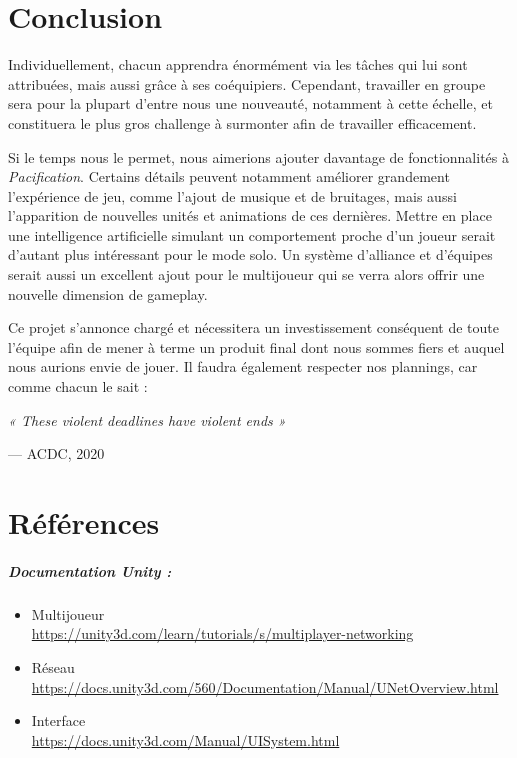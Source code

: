 \documentclass[12pt]{report}
\begin{document}
\chapter{Conclusion}

Individuellement, chacun apprendra énormément via les tâches qui lui sont attribuées, mais aussi grâce à ses coéquipiers. Cependant, travailler en groupe sera pour la plupart d’entre nous une nouveauté, notamment à cette échelle, et constituera le plus gros challenge à surmonter afin de travailler efficacement.

Si le temps nous le permet, nous aimerions ajouter davantage de fonctionnalités à \textit{Pacification}. Certains détails peuvent notamment améliorer grandement l’expérience de jeu, comme l’ajout de musique et de bruitages, mais aussi l’apparition de nouvelles unités et animations de ces dernières. Mettre en place une intelligence artificielle simulant un comportement proche d’un joueur serait d’autant plus intéressant pour le mode solo. Un système d’alliance et d’équipes serait aussi un excellent ajout pour le multijoueur qui se verra alors offrir une nouvelle dimension de gameplay.

 Ce projet s’annonce chargé et nécessitera un investissement conséquent de toute l’équipe afin de mener à terme un produit final dont nous sommes fiers et auquel nous aurions envie de jouer. Il faudra également respecter nos plannings, car comme chacun le sait :


\epigraph{\textit{« These violent deadlines have violent ends »}}{--- \textup{ACDC, 2020}}

\chapter{Références}

\paragraph{\bfseries{Documentation Unity :}}

\begin{itemize}[label=\textbullet]
    \item Multijoueur \\ \url{https://unity3d.com/learn/tutorials/s/multiplayer-networking}
    \item Réseau \\ \url{https://docs.unity3d.com/560/Documentation/Manual/UNetOverview.html}
    \item Interface \\ \url{https://docs.unity3d.com/Manual/UISystem.html}
\end{itemize}
\end{document}
